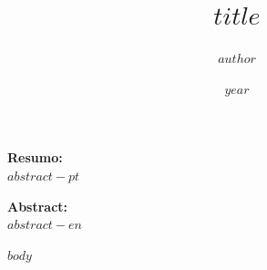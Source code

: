 \documentclass[
	12pt,				%
	article,			%
	oneside,			%
	a4paper,			%
	english,			%
	brazil				%
	]{abntex2}
\title{$title$}
\author{$author$}
\date{$year$}
\begin{document}
\maketitle

\vspace{1em}
\noindent\textbf{Resumo:}\\
$abstract-pt$

\vspace{1em}
\noindent\textbf{Abstract:}\\
$abstract-en$
\vspace{2em}

$body$



\end{document}
